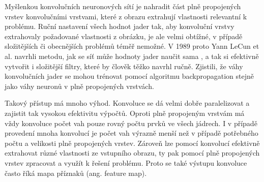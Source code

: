 

Myšlenkou konvolučních neuronových sítí je nahradit část plně propojených
vrstev konvolučními vrstvami, které z obrazu extrahují vlastnosti relevantní k
problému. Ruční nastavení všech hodnot jader tak, aby konvoluční vrstvy
extrahovaly požadované vlastnosti z obrázku, je ale velmi obtížné, v případě
složitějších či obecnějších problémů téměř nemožné. V 1989 proto Yann LeCun et
al. navrhli metodu, jak se síť může hodnoty jader naučit sama \cite{lecun1989},
a tak si efektivně vytvořit i složitější filtry, které by člověk těžko navrhl
ručně. Zjistili, že váhy konvolučních jader se mohou trénovat pomocí algoritmu
backpropagation stejně jako váhy neuronů v plně propojených vrstvách.

Takový přístup má mnoho výhod. Konvoluce se dá velmi dobře paralelizovat a
zajistit tak vysokou efektivitu výpočtů. Oproti plně propojeným vrstvám má vždy
konvoluce počet vah pouze rovný počtu prvků ve všech jádrech. I v případě
provedení mnoha konvolucí je počet vah výrazně menší než v případě potřebného
počtu a velikosti plně propojených vrstev. Zároveň lze pomocí konvolucí
efektivně extrahovat různé vlastnosti ze vstupního obrazu, ty pak pomocí plně
propojených vrstev zpracovat a využít k řešení problému. Proto se také výstupu
konvoluce často říká mapa příznaků (ang. feature map).


